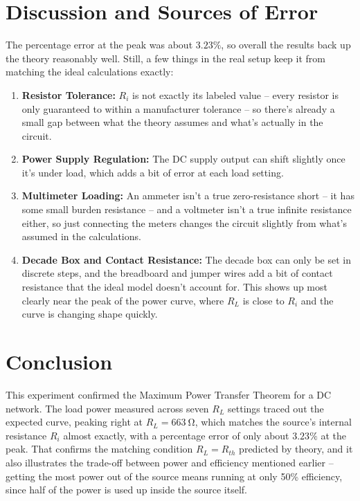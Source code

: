 \section{Discussion and Sources of Error}
The percentage error at the peak was about $3.23\%$, so overall the results back up the theory reasonably well. Still, a few things in the real setup keep it from matching the ideal calculations exactly:
\begin{enumerate}
    \item \textbf{Resistor Tolerance:} $R_i$ is not exactly its labeled value -- every resistor is only guaranteed to within a manufacturer tolerance -- so there's already a small gap between what the theory assumes and what's actually in the circuit.
    \item \textbf{Power Supply Regulation:} The DC supply output can shift slightly once it's under load, which adds a bit of error at each load setting.
    \item \textbf{Multimeter Loading:} An ammeter isn't a true zero-resistance short -- it has some small burden resistance -- and a voltmeter isn't a true infinite resistance either, so just connecting the meters changes the circuit slightly from what's assumed in the calculations.
    \item \textbf{Decade Box and Contact Resistance:} The decade box can only be set in discrete steps, and the breadboard and jumper wires add a bit of contact resistance that the ideal model doesn't account for. This shows up most clearly near the peak of the power curve, where $R_L$ is close to $R_i$ and the curve is changing shape quickly.
\end{enumerate}

\section{Conclusion}
This experiment confirmed the Maximum Power Transfer Theorem for a DC network. The load power measured across seven $R_L$ settings traced out the expected curve, peaking right at $R_L=\qty{663}{\ohm}$, which matches the source's internal resistance $R_i$ almost exactly, with a percentage error of only about $3.23\%$ at the peak. That confirms the matching condition $R_L=R_{th}$ predicted by theory, and it also illustrates the trade-off between power and efficiency mentioned earlier -- getting the most power out of the source means running at only 50\% efficiency, since half of the power is used up inside the source itself.

